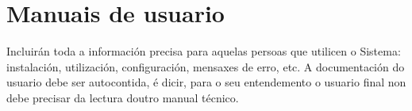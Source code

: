 \chapter{Manuais de usuario}

Incluirán toda a información precisa para aquelas persoas que utilicen o Sistema: instalación, utilización, configuración,
mensaxes de erro, etc. A documentación do usuario debe ser autocontida, é dicir, para o seu entendemento o usuario final
non debe precisar da lectura doutro manual técnico.
